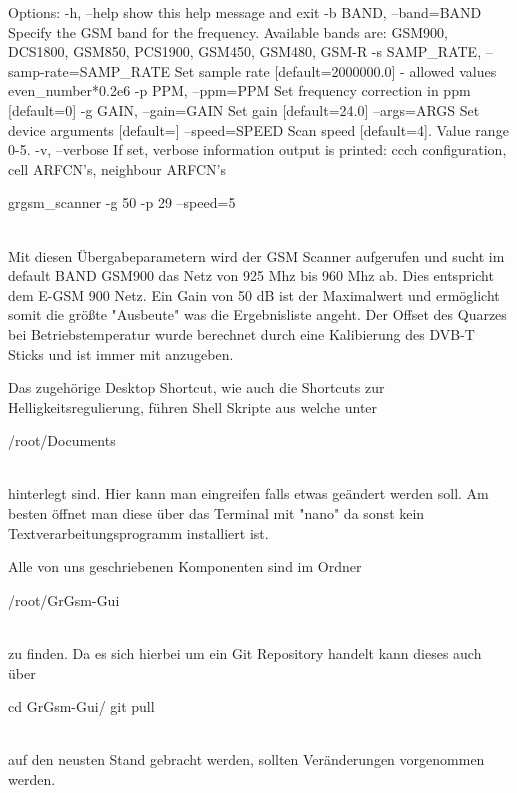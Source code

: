 \begin{code}
Options:
  -h, --help            show this help message and exit
  -b BAND, --band=BAND  Specify the GSM band for the frequency. Available
                        bands are: GSM900, DCS1800, GSM850, PCS1900, GSM450,
                        GSM480, GSM-R
  -s SAMP_RATE, --samp-rate=SAMP_RATE
                        Set sample rate [default=2000000.0] - allowed values
                        even_number*0.2e6
  -p PPM, --ppm=PPM     Set frequency correction in ppm [default=0]
  -g GAIN, --gain=GAIN  Set gain [default=24.0]
  --args=ARGS           Set device arguments [default=]
  --speed=SPEED         Scan speed [default=4]. Value range 0-5.
  -v, --verbose         If set, verbose information output is printed: ccch
                        configuration, cell ARFCN's, neighbour ARFCN's
                        
                   
grgsm_scanner -g 50 -p 29 --speed=5
\end{code}
\noindent\\Mit diesen Übergabeparametern wird der GSM Scanner aufgerufen und sucht im default BAND GSM900 das Netz von 925 Mhz bis 960 Mhz ab. Dies entspricht dem E-GSM 900 Netz. Ein Gain von 50 dB ist der Maximalwert und ermöglicht somit die größte "Ausbeute" was die Ergebnisliste angeht. Der Offset des Quarzes bei Betriebstemperatur wurde berechnet durch eine Kalibierung des DVB-T Sticks und ist immer mit anzugeben. 

Das zugehörige Desktop Shortcut, wie auch die Shortcuts zur Helligkeitsregulierung, führen Shell Skripte aus welche unter 
\begin{code}
/root/Documents
\end{code}
\noindent\\hinterlegt sind. Hier kann man eingreifen falls etwas geändert werden soll. Am besten öffnet man diese über das Terminal mit "nano" da sonst kein Textverarbeitungsprogramm installiert ist. 

Alle von uns geschriebenen Komponenten sind im Ordner 
\begin{code}
/root/GrGsm-Gui
\end{code}
\noindent\\zu finden. Da es sich hierbei um ein Git Repository handelt kann dieses auch über 
\begin{code}
cd GrGsm-Gui/
git pull
\end{code}
\noindent\\auf den neusten Stand gebracht werden, sollten Veränderungen vorgenommen werden. 
